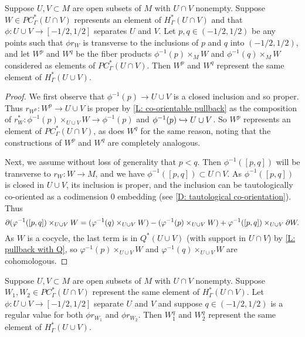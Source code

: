 \begin{lemma}\label{L: different point}
	Suppose $U,V \subset M$ are open subsets of $M$ with $U \cap V$ nonempty.
	Suppose $W \in PC^*_\Gamma(U \cap V)$ represents an element of $H^*_\Gamma(U \cap V)$ and that $\phi \colon U \cup V \to [-1/2,1/2]$ separates $U$ and $V$.
	Let $p, q\in (-1/2,1/2)$ be any points such that $\phi r_W$ is transverse to the inclusions of $p$ and $q$ into $(-1/2,1/2)$, and let $W^p$ and $W^{q}$ be the fiber products $\phi^{-1}(p) \times_M W$ and $\phi^{-1}(q) \times_M W$ considered as elements of  $PC^*_\Gamma(U \cap V)$.
	Then $W^p$ and $W^q$ represent the same element of $H^*_\Gamma(U \cup V)$.
\end{lemma}

\begin{proof}
	We first observe that $\phi^{-1}(p) \to U \cup V$ is a closed inclusion and so proper.
	Thus $r_{W^p} \colon W^p \to U \cup V$ is proper by \cref{L: co-orientable pullback} as the composition of $r_W^* \colon \phi^{-1}(p)\times_{U \cup V}W \to \phi^{-1}(p)$ and $\phi^{-1}(p) \hookrightarrow U \cup V$.
	So $W^p$ represents an element of $PC^*_\Gamma(U \cap V)$, as does $W^q$ for the same reason, noting that the constructions of $W^p$ and $W^q$ are completely analogous.

	Next, we assume without loss of generality that $p<q$.
	Then $\phi^{-1}([p,q])$ will be transverse to $r_W \colon W \to M$, and we have $\phi^{-1}([p,q]) \subset U \cap V$.
	As $\phi^{-1}([p,q])$ is closed in $U \cup V$, its inclusion is proper, and the inclusion can be tautologically co-oriented as a codimension $0$ embedding (see \cref{D: tautological co-orientation}).
	Thus $$\partial(\varphi^{-1}([p,q])\times_{U \cup V} W = (\varphi^{-1}(q)\times_{U \cup V} W)-(\varphi^{-1}(p)\times_{U \cup V} W)+ \varphi^{-1}([p,q])\times_{U \cup V} \partial W.$$
	As $W$ is a cocycle, the last term is in $Q^*(U \cup V)$ (with support in $U \cap V$) by \cref{L: pullback with Q}, so $\varphi^{-1}(p)\times_{U \cup V} W$ and $\varphi^{-1}(q)\times_{U \cup V} W$ are cohomologous.
\end{proof}

\begin{lemma}\label{L: different W}
	Suppose $U,V \subset M$ are open subsets of $M$ with $U \cap V$ nonempty.
	Suppose $W_1, W_2 \in PC^*_\Gamma(U \cap V)$ represent the same element of $H^*_\Gamma(U \cap V)$.
	Let $\phi \colon U \cup V \to [-1/2,1/2]$ separate $U$ and $V$ and suppose $q \in (-1/2,1/2)$ is a regular value for both $\phi r_{W_1}$ and $\phi r_{W_2}$.
	Then $W_1^q$ and $W_2^q$ represent the same element of $H^*_\Gamma(U \cup V)$.
\end{lemma}

